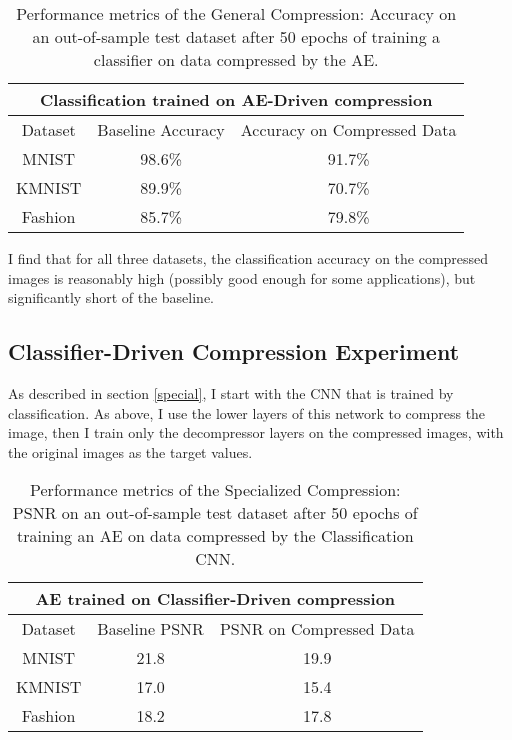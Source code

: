 \documentclass[twoside,11pt]{article}
\begin{document}

\begin{table}[h]
  \centering
  \begin{tabular}{|c||c|c|}
    \hline
    \multicolumn{3}{|c|}{Classification trained on AE-Driven compression}\\
    \hline
    Dataset & Baseline Accuracy & Accuracy on Compressed Data \\
    \hline
    MNIST & 98.6\% & 91.7\%\\
    \hline
    KMNIST & 89.9\% & 70.7\%\\
    \hline
    Fashion & 85.7\% & 79.8\%\\
    \hline
  \end{tabular}
  \caption{Performance metrics of the General Compression: 
   Accuracy on an out-of-sample test dataset after 50 epochs of training a classifier on
   data compressed by the AE.}
  \label{table:general}
\end{table}

I find that for all three datasets, the classification accuracy on the compressed images
is reasonably high (possibly good enough for some applications), but significantly 
short of the baseline.


\subsection{Classifier-Driven Compression Experiment} \label{expClass}

As described in section \ref{special}, I start with the CNN that is trained by classification.
As above, I use the lower layers of this network to compress the image, then I train
only the decompressor layers on the compressed images, with the original images
as the target values.


\begin{table}[h]
  \centering
  \begin{tabular}{|c||c|c|}
    \hline
    \multicolumn{3}{|c|}{AE trained on Classifier-Driven compression}\\
    \hline
    Dataset & Baseline PSNR & PSNR on Compressed Data \\
    \hline
    MNIST & 21.8 & 19.9\\
    \hline
    KMNIST & 17.0 & 15.4\\
    \hline
    Fashion & 18.2 & 17.8\\
    \hline
  \end{tabular}
  \caption{Performance metrics of the Specialized Compression: 
   PSNR on an out-of-sample test dataset after 50 epochs of training an AE on
   data compressed by the Classification CNN.}
  \label{table:special}
\end{table}
\end{document}
